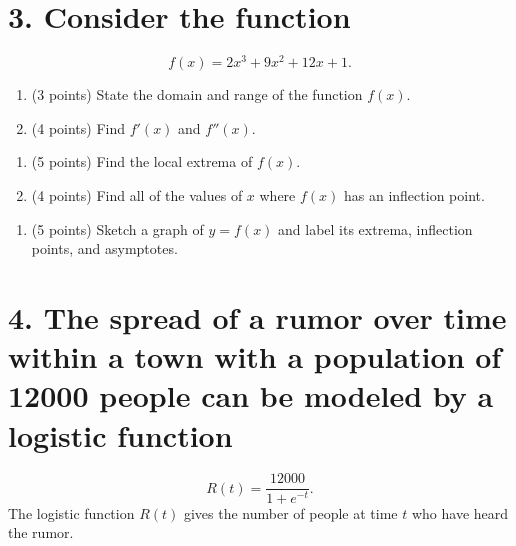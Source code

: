 \documentclass[12pt]{article}
\begin{document}
\newpage

\section*{3. Consider the function}
\[ f(x) = 2x^3 + 9x^2 + 12x + 1. \]

\begin{enumerate}[label=(\alph*)]
    \item (3 points) State the domain and range of the function $f(x)$.
    
    \vspace{3cm}

    \item (4 points) Find $f'(x)$ and $f''(x)$.
    
    \vspace{4cm}
    
\end{enumerate}

\newpage

\begin{enumerate}[label=(\alph*)]\addtocounter{enumi}{2} %
    \item (5 points) Find the local extrema of $f(x)$.
    
    \vspace{5cm}
    
    \item (4 points) Find all of the values of $x$ where $f(x)$ has an inflection point.
    
    \vspace{4cm}
    
\end{enumerate}

\newpage

\begin{enumerate}[label=(\alph*)]\addtocounter{enumi}{4} %
    \item (5 points) Sketch a graph of $y=f(x)$ and label its extrema, inflection points, and asymptotes.
    
    \vspace{8cm}
    
\end{enumerate}

\newpage

\section*{4. The spread of a rumor over time within a town with a population of 12000 people can be modeled by a logistic function}
\[ R(t) = \frac{12000}{1+e^{-t}}. \]
The logistic function $R(t)$ gives the number of people at time $t$ who have heard the rumor.
\end{document}
